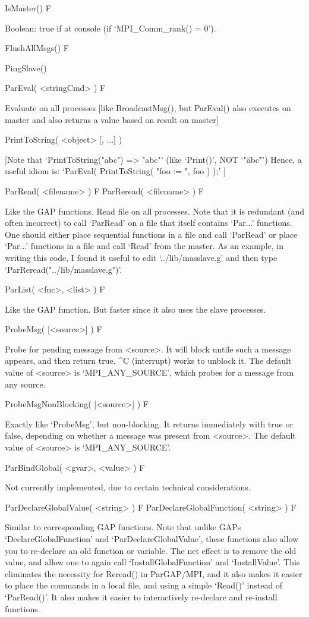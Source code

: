\>IsMaster() F

Boolean:  true if at console (if `MPI_Comm_rank() = 0').

\>FlushAllMsgs() F

\>PingSlave()

\>ParEval( <stringCmd> ) F

Evaluate on all processes
   [like BroadcastMsg(), but ParEval() also executes on master
    and also returns a value based on result on master]

\>PrintToString( <object> [, ...] )

   [Note that `PrintToString("abc") => "abc"' 
    (like `Print()', NOT `"\"abc\""')
     Hence, a useful idiom is:  `ParEval( PrintToString( "foo := ", foo ) );'  ]

\>ParRead( <filename> ) F
\>ParReread( <filename> ) F

Like the GAP functions.  Read file on all processes.
Note that it is redundant (and often incorrect) to call `ParRead' on
a file that itself contains `Par...' functions.  One should either
place sequential functions in a file and call `ParRead' or place
`Par...' functions in a file and call `Read' from the master.
As an example, in writing this code, I found it useful to edit
`../lib/masslave.g' and then type `ParReread("../lib/masslave.g")'.

\>ParList( <fnc>, <list> ) F

Like the GAP function.  But faster since it also uses the slave processes.

\>ProbeMsg( [<source>] ) F

Probe for pending message from <source>.  It will block untile such
a message appears, and then return true.  ^C (interrupt) works to unblock it.
The default value of <source> is `MPI_ANY_SOURCE', which probes for
a message from any source.

\>ProbeMsgNonBlocking( [<source>] ) F

Exactly like `ProbeMsg', but non-blocking.  It returns immediately
with true or false, depending on whether a message was present
from <source>.  The default value of <source> is `MPI_ANY_SOURCE'.

\>ParBindGlobal( <gvar>, <value> ) F

Not currently implemented, due to certain technical considerations.

\>ParDeclareGlobalValue( <string> ) F
\>ParDeclareGlobalFunction( <string> ) F

Similar to corresponding GAP functions.
Note that unlike GAP\pif s `DeclareGlobalFunction' and `ParDeclareGlobalValue',
these functions also allow you to re-declare an old function or variable.
The net effect is to remove the old value, and allow one to again call
`InstallGlobalFunction' and `InstallValue'.  This eliminates the necessity
for Reread() in ParGAP/MPI, and it also makes it easier to place the commands
in a local file, and using a simple `Read()' instead of `ParRead()'.  It
also makes it easier to interactively re-declare and re-install
functions.

